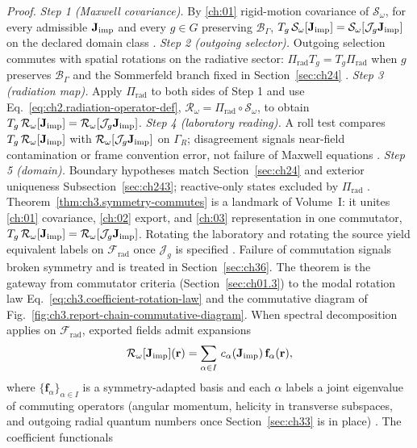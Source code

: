 \noindent\textit{Proof.}
\emph{Step 1 (Maxwell covariance).} By \ref{ch:01} rigid-motion covariance of \(\mathcal{S}_\omega\), for every admissible \(\mathbf{J}_{\mathrm{imp}}\) and every \(g\in G\) preserving \(\mathcal{B}_\Gamma\),
\(T_g\,\mathcal{S}_\omega[\mathbf{J}_{\mathrm{imp}}]=\mathcal{S}_\omega[\mathcal{J}_g\mathbf{J}_{\mathrm{imp}}]\) on the declared domain class .
\emph{Step 2 (outgoing selector).} Outgoing selection commutes with spatial rotations on the radiative sector: \(\Pi_{\mathrm{rad}}T_g=T_g\Pi_{\mathrm{rad}}\) when \(g\) preserves \(\mathcal{B}_\Gamma\) and the Sommerfeld branch fixed in Section~\ref{sec:ch24} .
\emph{Step 3 (radiation map).} Apply \(\Pi_{\mathrm{rad}}\) to both sides of Step 1 and use Eq.~\eqref{eq:ch2.radiation-operator-def}, \(\mathcal{R}_\omega=\Pi_{\mathrm{rad}}\circ\mathcal{S}_\omega\), to obtain
\(T_g\,\mathcal{R}_\omega[\mathbf{J}_{\mathrm{imp}}]=\mathcal{R}_\omega[\mathcal{J}_g\mathbf{J}_{\mathrm{imp}}]\).
\emph{Step 4 (laboratory reading).} A roll test compares \(T_g\,\mathcal{R}_\omega[\mathbf{J}_{\mathrm{imp}}]\) with \(\mathcal{R}_\omega[\mathcal{J}_g\mathbf{J}_{\mathrm{imp}}]\) on \(\Gamma_R\); disagreement signals near-field contamination or frame convention error, not failure of Maxwell equations .
\emph{Step 5 (domain).} Boundary hypotheses match Section~\ref{sec:ch24} and exterior uniqueness Subsection~\ref{sec:ch243}; reactive-only states excluded by \(\Pi_{\mathrm{rad}}\) .
Theorem~\ref{thm:ch3.symmetry-commutes} is a landmark of Volume~I: it unites \ref{ch:01} covariance, \ref{ch:02} export, and \ref{ch:03} representation in one commutator,
\(T_g\,\mathcal{R}_\omega[\mathbf{J}_{\mathrm{imp}}]=\mathcal{R}_\omega[\mathcal{J}_g\mathbf{J}_{\mathrm{imp}}]\).
Rotating the laboratory and rotating the source yield equivalent labels on \(\mathcal{F}_{\mathrm{rad}}\) once \(\mathcal{J}_g\) is specified . Failure of commutation signals broken symmetry and is treated in Section~\ref{sec:ch36}. The theorem is the gateway from commutator criteria (Section~\ref{sec:ch01.3}) to the modal rotation law Eq.~\eqref{eq:ch3.coefficient-rotation-law} and the commutative diagram of Fig.~\ref{fig:ch3.report-chain-commutative-diagram}.
When spectral decomposition applies on \(\mathcal{F}_{\mathrm{rad}}\), exported fields admit expansions
\begin{equation}
\label{eq:ch3.modal-coordinate-preview}
\mathcal{R}_\omega[\mathbf{J}_{\mathrm{imp}}](\mathbf{r})
=
\sum_{\alpha\in I}\,c_\alpha(\mathbf{J}_{\mathrm{imp}})\,\mathbf{f}_\alpha(\mathbf{r}),
\end{equation}
where \(\{\mathbf{f}_\alpha\}_{\alpha\in I}\) is a symmetry-adapted basis and each \(\alpha\) labels a joint eigenvalue of commuting operators (angular momentum, helicity in transverse subspaces, and outgoing radial quantum numbers once Section~\ref{sec:ch33} is in place) . The coefficient functionals
